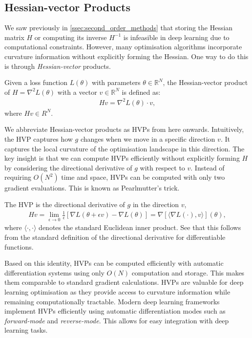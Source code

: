 \subsection{Hessian-vector Products}
\label{ssec:hessian_vector_products}

We saw previously in \cref{ssec:second_order_methods} that storing the Hessian matrix $H$ or computing its inverse $H^{-1}$ is infeasible in deep learning due to computational constraints. However, many optimisation algorithms incorporate curvature information without explicitly forming the Hessian. One way to do this is through \textit{Hessian-vector} products.

\begin{definition}
    Given a loss function $L(\theta)$ with parameters $\theta \in \mathbb{R}^N$, the Hessian-vector product of $H = \nabla^2 L(\theta)$ with a vector $v \in \mathbb{R}^N$ is defined as:
    \begin{align}
        Hv = \nabla^2 L(\theta) \cdot v, 
    \end{align}
    where $Hv \in R^N$.
\end{definition}
We abbreviate Hessian-vector products as HVPs from here onwards. Intuitively, the HVP captures how $g$ changes when we move in a specific direction $v$. It captures the local curvature of the optimisation landscape in this direction. The key insight is that we can compute HVPs efficiently without explicitly forming $H$ by considering the directional derivative of $g$ with respect to $v$. Instead of requiring $O(N^2)$ time and space, HVPs can be computed with only two gradient evaluations. This is known as Pearlmutter's trick.

\begin{definition} The HVP is the directional derivative of $g$ in the direction $v$,
\begin{align}
    Hv = \lim_{\epsilon \to 0} \frac{1}{\epsilon}[\nabla L(\theta + \epsilon v) - \nabla L(\theta)] = \nabla[\langle\nabla L(\cdot), v\rangle](\theta), 
\end{align} 
where $\langle \cdot, \cdot \rangle$ denotes the standard Euclidean inner product. See that this follows from the standard definition of the directional derivative for differentiable functions.
\end{definition}
Based on this identity, HVPs can be computed efficiently with automatic differentiation systems using only $O(N)$ computation and storage. This makes them comparable to standard gradient calculations. HVPs are valuable for deep learning optimisation as they provide access to curvature information while remaining computationally tractable. Modern deep learning frameworks implement HVPs efficiently using automatic differentiation modes such as \textit{forward-mode} and \textit{reverse-mode}. This allows for easy integration with deep learning tasks.

